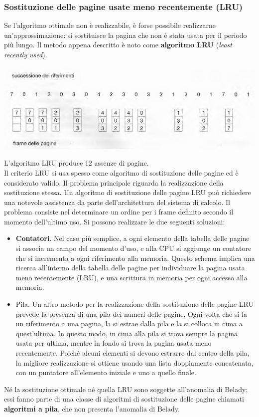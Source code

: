 \documentclass[11pt,a4paper]{article}
\begin{document}
\subsubsection{Sostituzione delle pagine usate meno recentemente (LRU)}
Se l'algoritmo ottimale non è realizzabile, è forse possibile realizzarne un'approssimazione: si sostituisce la
pagina che non è stata usata per il periodo più lungo. Il metodo appena descritto è noto co­me \textbf{algoritmo LRU} (\emph{least recently used}).
\begin{center}
  \includegraphics[scale=0.6]{img/0050.png}
\end{center}
L'algoritmo LRU produce 12 assenze di pagine.
\medskip\\
Il criterio LRU si usa spesso come algoritmo di sostituzione delle pagine ed è considera­to valido. Il problema principale riguarda la realizzazione della sostituzione stessa. Un algorit­mo di sostituzione delle pagine LRU può richiedere una notevole assistenza da parte dell'ar­chitettura del sistema di calcolo. Il problema consiste nel determinare un ordine per i frame
definito secondo il momento dell'ultimo uso. Si possono realizzare le due seguenti soluzioni:
\begin{itemize}
  \item \textbf{Contatori}. Nel caso più semplice, a ogni elemento della tabella delle pagine si associa un campo del momento d'uso, e alla CPU si aggiunge un contatore che si incrementa a ogni riferimento alla memoria. Questo schema implica una ricerca all'interno del­la tabella delle pagine per individuare la pagina usata meno recentemente (LRU), e una scrittura in memoria per ogni accesso alla memoria.
  \item Pila. Un altro metodo per la realizzazione della sostituzione delle pagine LRU prevede la presenza di una pila dei numeri delle pagine. Ogni volta che si fa un riferimento a una pagina, la si estrae dalla pila e la si colloca in cima a quest'ultima. In questo modo, in cima alla pila si trova sempre la pagina usata per ultima, mentre in fondo si trova la pagina usata meno recentemente. Poiché alcuni ele­menti si devono estrarre dal centro della pila, la migliore realizzazione si ottiene usan­do una lista doppiamente concatenata, con un puntatore all'elemento iniziale e uno a quello finale.
\end{itemize}
%
Né la sostituzione ottimale né quella LRU sono soggette all'anomalia di Belady; essi fanno parte di una classe di algoritmi di sostituzione delle pagine chiamati \textbf{algoritmi a pila}, che non presenta
l'anomalia di Belady.
\end{document}
